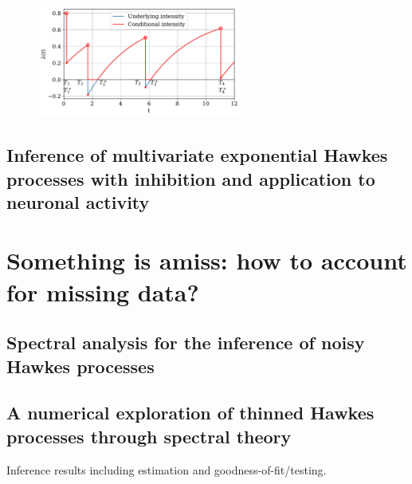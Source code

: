         \begin{figure}[!ht]
            \centering
            \includegraphics[width=0.6\textwidth]{images/chapter2/cooldownTimesMarkedSerif2.pdf}
            \caption{}
            \label{fig:chap0_univariate_underlying_examples}
        \end{figure}



    \subsection{Inference of multivariate exponential Hawkes processes with inhibition and application to neuronal activity}
\section{Something is amiss: how to account for missing data?}\label{sec:chap0_missing_data}
    \subsection{Spectral analysis for the  inference of noisy Hawkes processes}
    \subsection{A numerical exploration of thinned Hawkes processes through spectral theory}
    Inference results including estimation and goodness-of-fit/testing.

    
